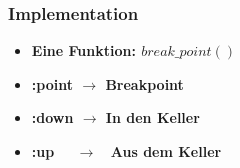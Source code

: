\begin{frame}
	\frametitle{Implementation}
	\begin{itemize}
		\item[]\textbf{Eine Funktion: $break\_point()$} \\
		\item[]\textbf{:point $\rightarrow$ Breakpoint} \\
		\item[]\textbf{:down $\rightarrow$ In den Keller} \\
		\item[]\textbf{:up \ \ $\rightarrow$ \ Aus dem Keller} \\
	\end{itemize}
\end{frame}

